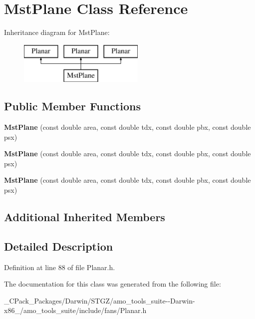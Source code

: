 \hypertarget{class_mst_plane}{}\section{Mst\+Plane Class Reference}
\label{class_mst_plane}
Inheritance diagram for Mst\+Plane\+:\begin{figure}[H]
\begin{center}
\leavevmode
\includegraphics[height=2.000000cm]{d5/dd0/class_mst_plane}
\end{center}
\end{figure}
\subsection*{Public Member Functions}
\begin{DoxyCompactItemize}
\item 
\mbox{\label{class_mst_plane_a7ecba572a4fbe043a4d9847c356c9ab5}} 
{\bfseries Mst\+Plane} (const double area, const double tdx, const double pbx, const double psx)
\item 
\mbox{\label{class_mst_plane_a7ecba572a4fbe043a4d9847c356c9ab5}} 
{\bfseries Mst\+Plane} (const double area, const double tdx, const double pbx, const double psx)
\item 
\mbox{\label{class_mst_plane_a7ecba572a4fbe043a4d9847c356c9ab5}} 
{\bfseries Mst\+Plane} (const double area, const double tdx, const double pbx, const double psx)
\end{DoxyCompactItemize}
\subsection*{Additional Inherited Members}


\subsection{Detailed Description}


Definition at line 88 of file Planar.\+h.



The documentation for this class was generated from the following file\+:\begin{DoxyCompactItemize}
\item 
\+\_\+\+C\+Pack\+\_\+\+Packages/\+Darwin/\+S\+T\+G\+Z/amo\+\_\+tools\+\_\+suite-\/-\/\+Darwin-\/x86\+\_/amo\+\_\+tools\+\_\+suite/include/fans/Planar.\+h\end{DoxyCompactItemize}

